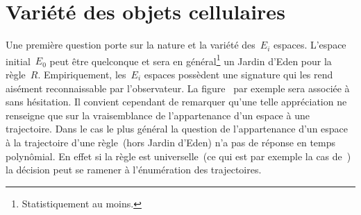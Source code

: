 \section{Vari\'et\'e des objets cellulaires}

Une premi\`ere question porte sur la nature et la vari\'et\'e des~$E_i$
espaces. %
L'espace initial~$E_0$ peut \^etre quelconque et sera en
g\'en\'eral\footnote{%
  Statistiquement au moins.} %
un Jardin d'Eden pour la r\`egle~$R$. %
Empiriquement, les~$E_i$ espaces poss\`edent une signature qui
les rend ais\'ement reconnaissable par l'observateur. %
La figure~ par exemple sera associ\'ee \`a~
sans h\'esitation. %
Il convient cependant de remarquer qu'une telle appr\'eciation ne
renseigne que sur la vraisemblance de l'appartenance d'un espace \`a une
trajectoire. %
Dans le cas le plus g\'en\'eral la question de l'appartenance d'un espace
\`a la trajectoire d'une r\`egle~(hors Jardin d'Eden) n'a pas de r\'eponse
en temps polyn\^omial. %
En effet si la r\`egle est universelle~(ce qui est par exemple la cas
de~) la d\'ecision peut se ramener \`a l'\'enum\'eration des
trajectoires. %

